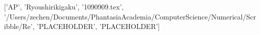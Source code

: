['AP', 'Ryoushirikigaku', '1090909.tex', '/Users/zechen/Documents/PhantasiaAcademia/ComputerScience/Numerical/Scribble/Re', 'PLACEHOLDER', 'PLACEHOLDER']
